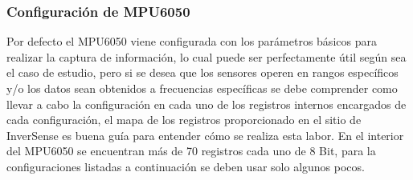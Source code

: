 \documentclass[12pt,a4paper]{article}
\begin{document}
\subsubsection{Configuración de MPU6050}
Por defecto el MPU6050 viene configurada con los parámetros básicos para realizar la captura de información, lo cual puede ser perfectamente útil según sea el caso de estudio, pero si se desea que los sensores operen en rangos específicos y/o los datos sean obtenidos a frecuencias específicas se debe comprender como llevar a cabo la configuración en cada uno de los registros internos encargados de cada configuración, el mapa de los registros \cite{MAPREGISTER} proporcionado  en el sitio de InverSense es buena guía para entender cómo se realiza esta labor.
\newline En el interior del MPU6050 se encuentran más de 70 registros cada uno de 8 Bit, para la configuraciones listadas a continuación se deben usar solo algunos pocos.
\end{document}
